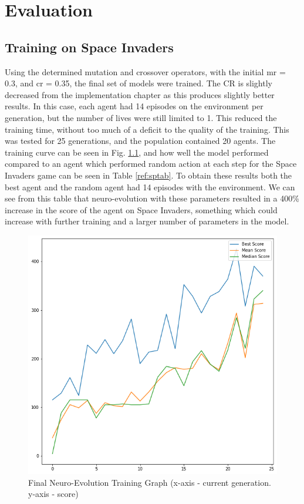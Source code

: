 \chapter{Evaluation}

\label{ch:eval}

\section{Training on Space Invaders}

Using the determined mutation and crossover operators, with the initial mr = 0.3, and cr = 0.35, the final set of models were trained. The CR is slightly decreased from the implementation chapter as this produces slightly better results. In this case, each agent had 14 episodes on the environment per generation, but the number of lives were still limited to 1. This reduced the training time, without too much of a deficit to the quality of the training.  This was tested for 25 generations, and the population contained 20 agents. The training curve can be seen in Fig. \ref{fig:final}, and how well the model performed compared to an agent which performed random action at each step for the Space Invaders game can be seen in Table \ref{ref:sptab}. To obtain these results both the best agent and the random agent had 14 episodes with the environment. We can see from this table that neuro-evolution with these parameters resulted in a 400\% increase in the score of the agent on Space Invaders, something which could increase with further training and a larger number of parameters in the model.

\begin{figure}[ht]
  \centering
  \includegraphics[scale=0.4]{images/final-run.png}
  \caption{Final Neuro-Evolution Training Graph (x-axis - current generation. y-axis - score)}
  \label{fig:final}
\end{figure}

